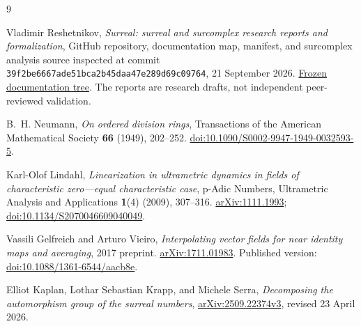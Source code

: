 \documentclass[11pt,a4paper]{article}
\numberwithin{equation}{section}
\theoremstyle{definition}
\theoremstyle{remark}
\begin{document}
\clearpage
\begin{thebibliography}{9}

Vladimir Reshetnikov,
\emph{Surreal: surreal and surcomplex research reports and formalization},
GitHub repository, documentation map, manifest, and surcomplex analysis
source inspected at commit
\texttt{39f2be6667ade51bca2b45daa47e289d69c09764}, 21 September 2026.
\href{https://github.com/VladimirReshetnikov/Surreal/tree/39f2be6667ade51bca2b45daa47e289d69c09764/docs}{Frozen documentation tree}.
The reports are research drafts, not independent peer-reviewed validation.

B.~H. Neumann,
\emph{On ordered division rings},
Transactions of the American Mathematical Society \textbf{66} (1949),
202--252.
\href{https://doi.org/10.1090/S0002-9947-1949-0032593-5}{doi:10.1090/S0002-9947-1949-0032593-5}.

Karl-Olof Lindahl,
\emph{Linearization in ultrametric dynamics in fields of characteristic
zero---equal characteristic case},
p-Adic Numbers, Ultrametric Analysis and Applications \textbf{1}(4)
(2009), 307--316.
\href{https://arxiv.org/abs/1111.1993}{arXiv:1111.1993};
\href{https://doi.org/10.1134/S2070046609040049}{doi:10.1134/S2070046609040049}.

Vassili Gelfreich and Arturo Vieiro,
\emph{Interpolating vector fields for near identity maps and averaging},
2017 preprint.
\href{https://arxiv.org/abs/1711.01983}{arXiv:1711.01983}.
Published version:
\href{https://doi.org/10.1088/1361-6544/aacb8e}{doi:10.1088/1361-6544/aacb8e}.

Elliot Kaplan, Lothar Sebastian Krapp, and Michele Serra,
\emph{Decomposing the automorphism group of the surreal numbers},
\href{https://arxiv.org/abs/2509.22374v3}{arXiv:2509.22374v3},
revised 23 April 2026.

\end{thebibliography}
\end{document}
